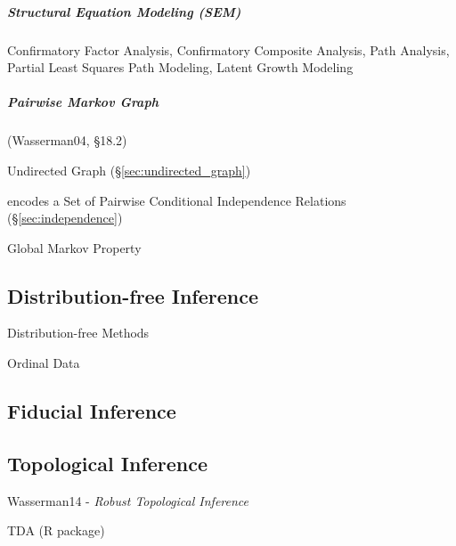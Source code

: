 \subparagraph{Structural Equation Modeling (SEM)}\label{sec:sem}\hfill


Confirmatory Factor Analysis, Confirmatory Composite Analysis, Path Analysis,
Partial Least Squares Path Modeling, Latent Growth Modeling



\subparagraph{Pairwise Markov Graph}\label{sec:pairwise_markov}\hfill

(Wasserman04, \S18.2)

Undirected Graph (\S\ref{sec:undirected_graph})

encodes a Set of Pairwise Conditional Independence Relations
(\S\ref{sec:independence})

Global Markov Property



\subsection{Distribution-free Inference}\label{sec:distribution_free}

Distribution-free Methods

Ordinal Data



\subsection{Fiducial Inference}\label{sec:fiducial_inference}

\subsection{Topological Inference}\label{sec:topological_inference}

Wasserman14 - \emph{Robust Topological Inference}

TDA (R package)



